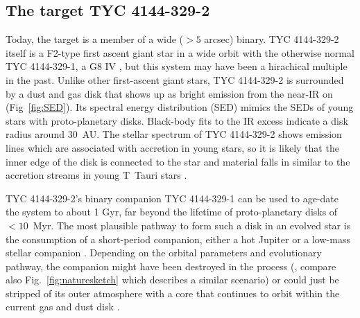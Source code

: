 \documentclass[letterpaper,11pt]{article}
\begin{document}
 

\subsection*{The target TYC 4144-329-2}

\vskip -0.1in
Today, the target is a member of a wide ($> 5$ arcsec) binary. TYC 4144-329-2 itself is a F2-type first ascent giant star in a wide orbit with the otherwise normal  TYC 4144-329-1, a G8 IV \cite{2009ApJ...696.1964M}, but this system may have been a hirachical multiple in the past. Unlike other first-ascent giant stars, TYC 4144-329-2 is surrounded by a dust and gas disk that shows up as bright emission from the near-IR on (Fig~\ref{fig:SED}). Its spectral energy distribution (SED) mimics the SEDs of young stars with proto-planetary disks. 
Black-body fits to the IR excess indicate a disk radius around 30~AU. The stellar spectrum of TYC 4144-329-2 shows emission lines which are associated with accretion in young stars, so it is likely that the inner edge of the disk is connected to the star and material falls in similar to the accretion streams in young T~Tauri stars \cite{2009ApJ...696.1964M}. 

TYC 4144-329-2's binary companion TYC 4144-329-1 can be used to age-date the system \cite{2009ApJ...696.1964M} to about 1 Gyr, far beyond the lifetime of proto-planetary disks of $<10$~Myr. The most plausible pathway to form such a disk in an evolved star is the consumption of a short-period companion, either a hot Jupiter or a low-mass stellar companion \cite{2009ApJ...696.1964M}. Depending on the orbital parameters and evolutionary pathway, the companion might have been destroyed in the process (\cite{2003ApJ...582.1032J}, compare also Fig.~\ref{fig:naturesketch} which describes a similar scenario) or could just be stripped of its outer atmosphere with a core that continues to orbit within the current gas and dust disk \cite{2003ASPC..293...76W}.
\end{document}
